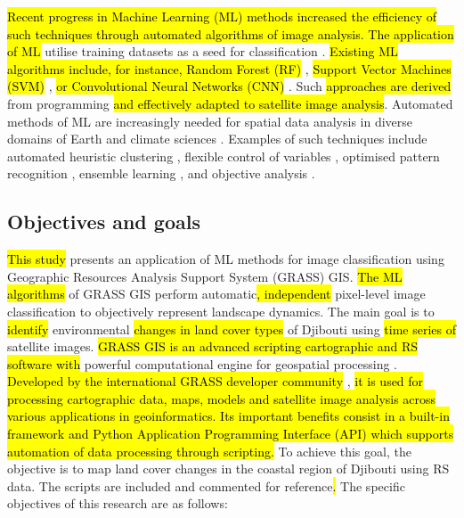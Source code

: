 \documentclass[jimaging,article,submit,pdftex,moreauthors]{Definitions/mdpi}
\begin{document}
 \hl{Recent progress in Machine Learning (ML) methods increased the efficiency of such techniques through automated algorithms of image analysis. The application of ML} utilise training datasets as a seed for classification \cite{FERCHICHI2024122211}. \hl{Existing ML algorithms include, for instance, Random Forest (RF)} \cite{Balha2022,Lemenkova202401}, \hl{Support Vector Machines (SVM)} \cite{10450641}, \hl{or Convolutional Neural Networks (CNN)} \cite{SUAREZFERNANDEZ2024}. Such \hl{approaches are derived} from programming\hl{ and effectively adapted to satellite image analysis}. Automated methods of ML are increasingly needed for spatial data analysis in diverse domains of Earth and climate sciences \cite{HUANG2020104580,Arabameri}. Examples of such techniques include automated heuristic clustering \cite{8524429,10615674,669164,4666175}, flexible control of variables \cite{8999627}, optimised pattern recognition \cite{9708387,1634653}, ensemble learning \cite{10145147}, and objective analysis \cite{8938484,9279780}. 

\subsection{Objectives and goals}

\hl{This study} presents an application of ML methods for image\hl{ }classification using\hl{ }Geographic Resources Analysis Support System (GRASS) GIS. \hl{The ML algorithms} of GRASS GIS perform\hl{ }automatic\hl{, independent} pixel-level image classification\hl{ }to objectively represent landscape dynamics. The main goal\hl{ }is to\hl{ identify} environmental \hl{ changes in land cover types }of Djibouti using \hl{ time series of }satellite images. \hl{GRASS GIS is an advanced scripting cartographic and RS software with} powerful computational engine for geospatial processing \cite{NETELER2012124}. \hl{Developed by the international GRASS developer community} \cite{grass_development_team_2025_14918754}, \hl{it is used for processing cartographic data, maps, models and satellite image analysis across various applications in geoinformatics. Its important benefits consist in a built-in framework and Python Application Programming Interface (API) which supports automation of data processing through scripting.} To achieve this goal, the objective\hl{ }is to map land cover changes in the coastal region of Djibouti\hl{ }using RS data.\hl{ }The\hl{ }scripts are included and commented for\hl{ }reference\hl{. }The specific objectives of this research are as follows:
\end{document}
